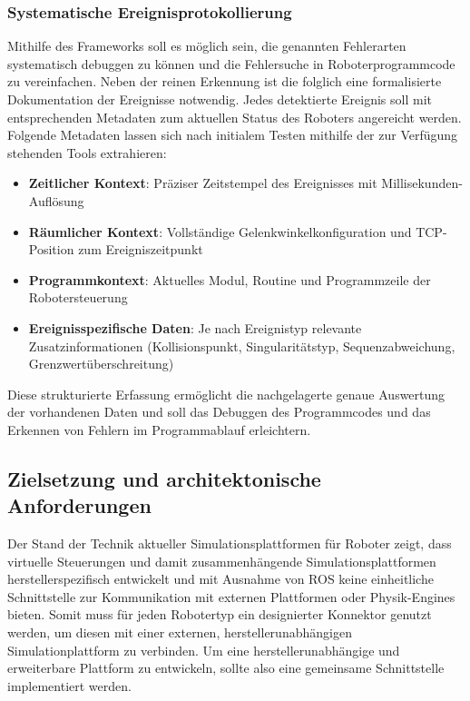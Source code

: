 \subsubsection{Systematische Ereignisprotokollierung}

Mithilfe des Frameworks soll es möglich sein, die genannten Fehlerarten
systematisch debuggen zu können und die Fehlersuche in Roboterprogrammcode zu
vereinfachen. Neben der reinen Erkennung ist die folglich eine formalisierte
Dokumentation der Ereignisse notwendig. Jedes detektierte Ereignis soll mit
entsprechenden Metadaten zum aktuellen Status des Roboters angereicht werden.
Folgende Metadaten lassen sich nach initialem Testen mithilfe der zur Verfügung
stehenden Tools extrahieren:

\begin{itemize}
	\item \textbf{Zeitlicher Kontext}: Präziser Zeitstempel des Ereignisses mit Millisekunden-Auflösung
	\item \textbf{Räumlicher Kontext}: Vollständige Gelenkwinkelkonfiguration und TCP-Position zum Ereigniszeitpunkt
	\item \textbf{Programmkontext}: Aktuelles Modul, Routine und Programmzeile der Robotersteuerung
	\item \textbf{Ereignisspezifische Daten}: Je nach Ereignistyp relevante Zusatzinformationen (Kollisionspunkt, Singularitätstyp, Sequenzabweichung, Grenzwertüberschreitung)
\end{itemize}

Diese strukturierte Erfassung ermöglicht die nachgelagerte genaue Auswertung der
vorhandenen Daten und soll das Debuggen des Programmcodes und das Erkennen von
Fehlern im Programmablauf erleichtern.

\subsection{Zielsetzung und architektonische Anforderungen}
Der Stand der Technik aktueller Simulationsplattformen für Roboter zeigt, dass
virtuelle Steuerungen und damit zusammenhängende Simulationsplattformen
herstellerspezifisch entwickelt und mit Ausnahme von ROS keine einheitliche
Schnittstelle zur Kommunikation mit externen Plattformen oder Physik-Engines
bieten. Somit muss für jeden Robotertyp ein designierter Konnektor genutzt
werden, um diesen mit einer externen, herstellerunabhängigen Simulationplattform
zu verbinden. Um eine herstellerunabhängige und erweiterbare Plattform zu
entwickeln, sollte also eine gemeinsame Schnittstelle implementiert werden.


